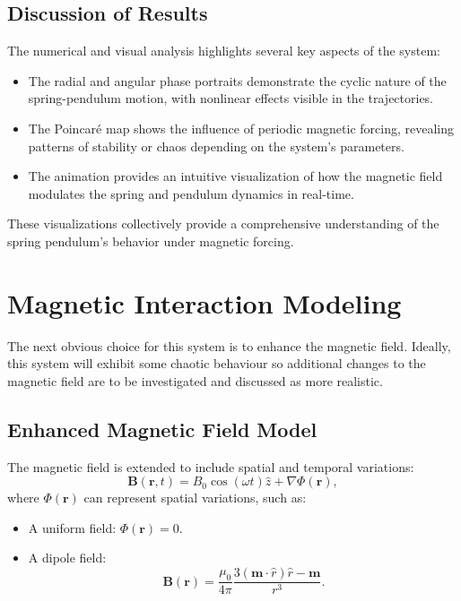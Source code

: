 \documentclass[12pt]{article}
\begin{document}
\subsection{Discussion of Results}
The numerical and visual analysis highlights several key aspects of the system:
\begin{itemize}
    \item The radial and angular phase portraits demonstrate the cyclic nature of the spring-pendulum motion, with nonlinear effects visible in the trajectories.
    \item The Poincaré map shows the influence of periodic magnetic forcing, revealing patterns of stability or chaos depending on the system's parameters.
    \item The animation provides an intuitive visualization of how the magnetic field modulates the spring and pendulum dynamics in real-time.
\end{itemize}
These visualizations collectively provide a comprehensive understanding of the spring pendulum's behavior under magnetic forcing.

\section{Magnetic Interaction Modeling}

The next obvious choice for this system is to enhance the magnetic field. Ideally, this system will exhibit some chaotic behaviour so additional changes to the magnetic field are to be investigated and discussed as more realistic.

\subsection{Enhanced Magnetic Field Model}
The magnetic field is extended to include spatial and temporal variations:
\[
\mathbf{B}(\mathbf{r}, t) = B_0 \cos(\omega t) \hat{z} + \nabla \Phi(\mathbf{r}),
\]
where \( \Phi(\mathbf{r}) \) can represent spatial variations, such as:
\begin{itemize}
    \item A uniform field: \( \Phi(\mathbf{r}) = 0 \).
    \item A dipole field:
    \[
    \mathbf{B}(\mathbf{r}) = \frac{\mu_0}{4\pi} \frac{3(\mathbf{m} \cdot \hat{r}) \hat{r} - \mathbf{m}}{r^3}.
    \]
\end{itemize}
\end{document}
